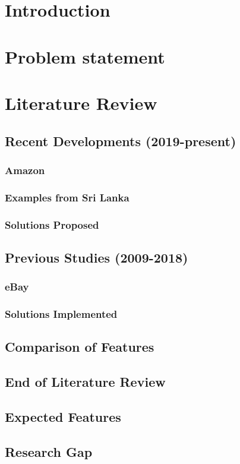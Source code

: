 \documentclass{article}
\begin{document}
\tableofcontents

\section{Introduction}
\section{Problem statement}
\section{Literature Review}
\subsection{Recent Developments (2019-present)}
\subsubsection{Amazon}
\subsubsection{Examples from Sri Lanka}
\subsubsection{Solutions Proposed}
\subsection{Previous Studies (2009-2018)}
\subsubsection{eBay}
\subsubsection{Solutions Implemented}
\subsection{Comparison of Features}
\subsection{End of Literature Review}
\subsection{Expected Features}
\subsection{Research Gap}
\end{document}
